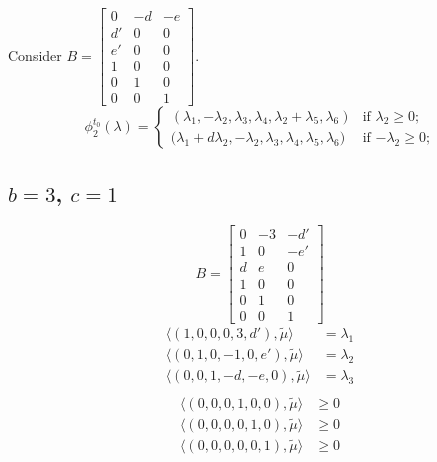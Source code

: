 \documentclass{amsart}
\numberwithin{theorem}{section}
\begin{document}
  Consider $B=\left[\begin{array}{ccc} 0 & -d & -e \\ d' & 0 & 0\\ e' & 0 & 0\\ 1 & 0 & 0\\ 0 & 1 & 0\\ 0 & 0 & 1\end{array}\right]$.
  \[
    \phi^{t_0}_2(\lambda)
    =
    \begin{cases} 
      (\lambda_1,-\lambda_2,\lambda_3,\lambda_4,\lambda_2+\lambda_5,\lambda_6) & \text{if $\lambda_2 \ge 0$;}\\
      \big(\lambda_1+d\lambda_2,-\lambda_2,\lambda_3,\lambda_4,\lambda_5,\lambda_6\big) & \text{if $-\lambda_2 \ge 0$;}
    \end{cases}
  \]

  \subsection{$b=3$, $c=1$}
  \[
    B=\left[\begin{array}{ccc} 
    0 & -3 & -d' \\ 
    1 & 0 & -e'\\ 
    d & e & 0\\ 
    1 & 0 & 0\\ 
    0 & 1 & 0\\ 
    0 & 0 & 1
    \end{array}\right]
  \]
  \begin{align*}
    \langle (1,0,0,0,3,d'), \tilde\mu\rangle &= \lambda_1\\ 
    \langle (0,1,0,-1,0,e'), \tilde\mu\rangle &= \lambda_2\\ 
    \langle (0,0,1,-d,-e,0), \tilde\mu\rangle &= \lambda_3\\ 
  \end{align*}
  \begin{align*}
    \langle (0,0,0,1,0,0), \tilde\mu\rangle &\ge 0\\ 
    \langle (0,0,0,0,1,0), \tilde\mu\rangle &\ge 0\\ 
    \langle (0,0,0,0,0,1), \tilde\mu\rangle &\ge 0\\ 
  \end{align*}
\end{document}
